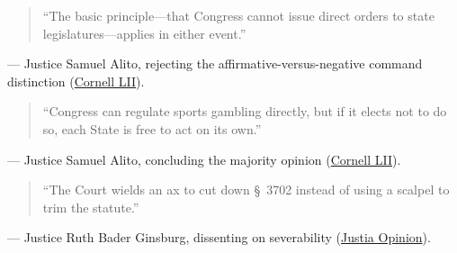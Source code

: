 \documentclass[12pt]{article}
\begin{document}
\begin{quote}
``The basic principle---that Congress cannot issue direct orders to state legislatures---applies in either event.''
\end{quote}
\noindent --- Justice Samuel Alito, rejecting the affirmative-versus-negative command distinction (\href{https://www.law.cornell.edu/supremecourt/text/16-476}{Cornell LII}).

\begin{quote}
``Congress can regulate sports gambling directly, but if it elects not to do so, each State is free to act on its own.''
\end{quote}
\noindent --- Justice Samuel Alito, concluding the majority opinion (\href{https://www.law.cornell.edu/supremecourt/text/16-476}{Cornell LII}).

\begin{quote}
``The Court wields an ax to cut down \S~3702 instead of using a scalpel to trim the statute.''
\end{quote}
\noindent --- Justice Ruth Bader Ginsburg, dissenting on severability (\href{https://supreme.justia.com/cases/federal/us/584/16-476/}{Justia Opinion}).
\end{document}
